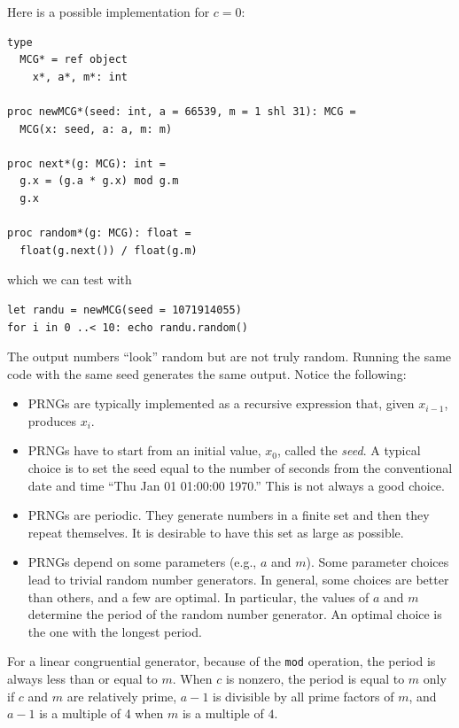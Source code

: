 \documentclass[justified, sixbynine]{tufte-book}
\def\ft{\small\tt}
\theoremstyle{plain}%
\newtheorem * {corollary}{Corollary}
\theoremstyle{definition}
\theoremstyle{remark}
\newtheorem * {remark}{Remark}
\newtheorem * {note}{Note}
\begin{document}
\begin{fullwidth}
Here is a possible implementation for $c=0$:
\begin{lstlisting}[caption={in file: {\ft nlib/randomgen.nim}}]
type
  MCG* = ref object
    x*, a*, m*: int

proc newMCG*(seed: int, a = 66539, m = 1 shl 31): MCG =
  MCG(x: seed, a: a, m: m)

proc next*(g: MCG): int =
  g.x = (g.a * g.x) mod g.m
  g.x

proc random*(g: MCG): float =
  float(g.next()) / float(g.m)
\end{lstlisting}

which we can test with
\begin{lstlisting}
let randu = newMCG(seed = 1071914055)
for i in 0 ..< 10: echo randu.random()
\end{lstlisting}

The output numbers ``look'' random but are not truly random. Running the same code with the same seed generates the same output. Notice the following:

\begin{itemize}
\item  PRNGs are typically implemented as a recursive expression that, given $%
x_{i-1}$, produces $x_i$.



\item  PRNGs have to start from an initial value, $x_0$, called the {\it seed}.
A typical choice is to set the seed equal to the number of seconds from the
conventional date and time ``Thu Jan 01 01:00:00 1970.'' This is not always
a good choice.

\item PRNGs are periodic. They generate numbers in a finite set and then they repeat themselves. It is desirable to have this set as large as possible.

\item  PRNGs depend on some parameters (e.g., $a$ and $m$). Some
parameter choices lead to trivial random number generators. In
general, some choices are better than others, and a few are optimal. In
particular, the values of $a$ and $m$ determine the period of the random
number generator. An optimal choice is the one with the longest period.
\end{itemize}

For a linear congruential generator, because of the {\ft mod} operation, the period is always less than or equal to $m$. When $c$ is nonzero, the period is equal to $m$ only if $c$ and $m$ are relatively prime, $a-1$ is divisible by all prime factors of $m$, and $a-1$ is a multiple of 4 when $m$ is a multiple of $4$.


\end{fullwidth}
\end{document}
